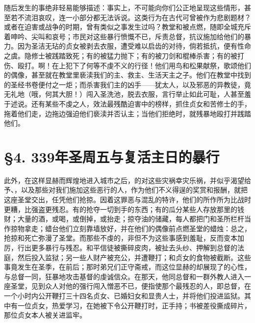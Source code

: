 随后发生的事绝非轻易能够描述：事实上，不可能向你们公正地呈现这些情形，甚至若不流泪哀叹，连一小部分都无法诉说。这类行为在古代可曾被作为悲剧题材？或者在迫害或战争的时期，曾有类似之事发生过吗？教堂和被点燃，随即全城充斥着呻吟、尖叫和哀号；市民对这些暴行愤慨不已，斥责总督，抗议施加给他们的暴力。因为圣洁无玷的贞女被剥去衣服，遭受难以启齿的对待，倘若抵抗，便有性命之虞。隐修士被践踏致死；有的被猛力抛下；有的被刀剑和棍棒杀害；有的被打伤、殴打。啊！在上犯下了何等不虔不义的行径！他们用鸟和松果献祭，歌颂他们的偶像，甚至就在教堂里亵渎我们的主、救主、生活天主之子。他们在教堂中找到的圣经书卷便付之一炬；而杀害我们主的凶手——犹太人，以及邪恶的异教徒，竟无礼地（哦，何其大胆！）闯入圣洗池，脱去衣服，言行举止如此可耻，人甚至羞于述说。还有某些不虔之人，效法最残酷迫害中的榜样，抓住贞女和苦修士的手，拖着他们走，边拖边强迫他们亵渎并否认主；当他们拒绝时，就残暴地殴打并践踏他们。\par


\section{§4. 339年圣周五与复活主日的暴行}

此外，在这样显赫而辉煌地进入城市之后，的对这些灾祸幸灾乐祸，并似乎渴望给予、，以及那些对我们施加这些恶行的人，作为他们不义得逞的奖赏和报酬，就把这座圣堂交出，任凭他们抢掠。因着这罪恶与混乱的特许，他们的所作所为比战时更糟，比强盗更残忍。有的抢夺一切到手的东西；有的瓜分某些人存放那里的钱财；大量的酒，或喝，或倒掉，或抬走；掠夺油的储藏，每人都把门和圣所栏杆当作掠物拿走；蜡台他们立刻靠墙放好，并在他们的偶像前点燃圣堂的蜡烛：总之，抢掠和死亡弥漫了圣堂。而那些不虔的，非但不为这些事感到羞耻，反而变本加厉，行出更多暴行与残忍。和平信徒被撕碎皮肉，被扯去头纱、押解到总督的法庭，然后投入监狱；另一些人财产被充公，并遭鞭打；和贞女的食物被截断。这些事竟发生在圣季，在前后；那时弟兄们正守斋戒，而这位显赫的却展现了的心性，与总督一同，狂暴地攻击基督的虔诚信众。在那天，他同总督和一群外教人进入一座圣堂，见到众人对他的强行闯入憎恶不已，便指使那个最残忍的人，即总督，在一个小时内公开鞭打三十四名贞女、已婚妇女和显贵人士，并将他们投进监狱。其中有一位贞女，热爱学习，在她被下令公开鞭打时，正手持；书被差役撕成碎片，那位贞女本人被关进监牢。\par

